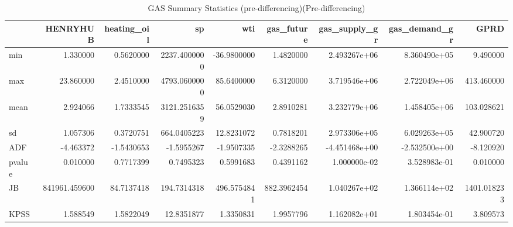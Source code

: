 \begin{table}
\centering
\caption{GAS Summary Statistics (pre-differencing)(Pre-differencing)}
\centering
\begin{tabular}[t]{l|r|r|r|r|r|r|r|r}
\hline
  & HENRYHUB & heating\_oil & sp & wti & gas\_future & gas\_supply\_gr & gas\_demand\_gr & GPRD\\
\hline
min & 1.330000 & 0.5620000 & 2237.4000000 & -36.9800000 & 1.4820000 & 2.493267e+06 & 8.360490e+05 & 9.490000\\
\hline
max & 23.860000 & 2.4510000 & 4793.0600000 & 85.6400000 & 6.3120000 & 3.719546e+06 & 2.722049e+06 & 413.460000\\
\hline
mean & 2.924066 & 1.7333545 & 3121.2516359 & 56.0529030 & 2.8910281 & 3.232779e+06 & 1.458405e+06 & 103.028621\\
\hline
sd & 1.057306 & 0.3720751 & 664.0405223 & 12.8231072 & 0.7818201 & 2.973306e+05 & 6.029263e+05 & 42.900720\\
\hline
ADF & -4.463372 & -1.5430653 & -1.5955267 & -1.9507335 & -2.3288265 & -4.451468e+00 & -2.532500e+00 & -8.120920\\
\hline
pvalue & 0.010000 & 0.7717399 & 0.7495323 & 0.5991683 & 0.4391162 & 1.000000e-02 & 3.528983e-01 & 0.010000\\
\hline
JB & 841961.459600 & 84.7137418 & 194.7314318 & 496.5754841 & 882.3962454 & 1.040267e+02 & 1.366114e+02 & 1401.018233\\
\hline
KPSS & 1.588549 & 1.5822049 & 12.8351877 & 1.3350831 & 1.9957796 & 1.162082e+01 & 1.803454e-01 & 3.809573\\
\hline
\end{tabular}
\end{table}
